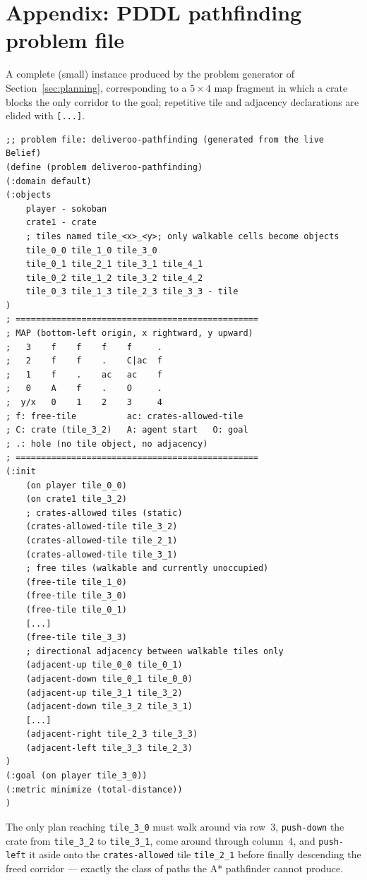\appendix
\section*{Appendix: PDDL pathfinding problem file}
\label{sec:appendix}

A complete (small) instance produced by the problem generator of
Section~\ref{sec:planning}, corresponding to a $5{\times}4$ map fragment in which a crate blocks
the only corridor to the goal; repetitive tile and adjacency declarations are elided with
\texttt{[...]}.

\begin{lstlisting}
;; problem file: deliveroo-pathfinding (generated from the live Belief)
(define (problem deliveroo-pathfinding)
(:domain default)
(:objects
    player - sokoban
    crate1 - crate
    ; tiles named tile_<x>_<y>; only walkable cells become objects
    tile_0_0 tile_1_0 tile_3_0
    tile_0_1 tile_2_1 tile_3_1 tile_4_1
    tile_0_2 tile_1_2 tile_3_2 tile_4_2
    tile_0_3 tile_1_3 tile_2_3 tile_3_3 - tile
)
; ================================================
; MAP (bottom-left origin, x rightward, y upward)
;   3    f    f    f    f     .
;   2    f    f    .    C|ac  f
;   1    f    .    ac   ac    f
;   0    A    f    .    O     .
;  y/x   0    1    2    3     4
; f: free-tile          ac: crates-allowed-tile
; C: crate (tile_3_2)   A: agent start   O: goal
; .: hole (no tile object, no adjacency)
; ================================================
(:init
    (on player tile_0_0)
    (on crate1 tile_3_2)
    ; crates-allowed tiles (static)
    (crates-allowed-tile tile_3_2)
    (crates-allowed-tile tile_2_1)
    (crates-allowed-tile tile_3_1)
    ; free tiles (walkable and currently unoccupied)
    (free-tile tile_1_0)
    (free-tile tile_3_0)
    (free-tile tile_0_1)
    [...]
    (free-tile tile_3_3)
    ; directional adjacency between walkable tiles only
    (adjacent-up tile_0_0 tile_0_1)
    (adjacent-down tile_0_1 tile_0_0)
    (adjacent-up tile_3_1 tile_3_2)
    (adjacent-down tile_3_2 tile_3_1)
    [...]
    (adjacent-right tile_2_3 tile_3_3)
    (adjacent-left tile_3_3 tile_2_3)
)
(:goal (on player tile_3_0))
(:metric minimize (total-distance))
)
\end{lstlisting}

The only plan reaching \texttt{tile\_3\_0} must walk around via row~3, \texttt{push-down} the
crate from \texttt{tile\_3\_2} to \texttt{tile\_3\_1}, come around through column~4, and
\texttt{push-left} it aside onto the \texttt{crates-allowed} tile \texttt{tile\_2\_1} before
finally descending the freed corridor --- exactly the class of paths the A* pathfinder cannot
produce.
